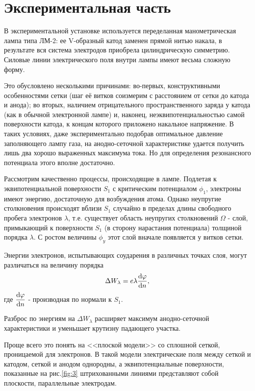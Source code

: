 \section{Экспериментальная часть}
В экспериментальной установке используется переделанная манометрическая лампа типа ЛМ-2: ее V-образный катод заменен прямой нитью накала, в результате вся система электродов приобрела цилиндрическую симметрию. Силовые линии электрического поля внутри лампы имеют весьма сложную форму.

Это обусловлено несколькими причинами: во-первых, конструктивными особенностями сетки (шаг её витков соизмерим с расстоянием от сетки до катода и анода); во вторых, наличием отрицательного пространственного заряда у катода (как в обычной электронной лампе) и, наконец, неэквипотенциальностью самой поверхности катода, к концам которого приложено накальное напряжение. В таких условиях, даже экспериментально подобрав оптимальное давление заполняющего лампу газа, на анодно-сеточной характеристике удается получить лишь два хорошо выраженных максимума тока. Но для определения резонансного потенциала этого вполне достаточно.

Рассмотрим качественно процессы, происходящие в лампе. Подлетая к эквипотенциальной поверхности $S_1$ с критическим потенциалом $\phi_1$, электроны имеют энергию, достаточную для возбуждения атома. Однако  неупругие столкновения происходят вблизи $S_1$ случайно в пределах длины свободного пробега электронов $\lambda$, т.е. существует область неупругих столкновений $\Omega$ -
слой, примыкающий к поверхности $S_1$ (в сторону нарастания потенциала) толщиной порядка $\lambda$. С ростом величины $\phi_y$ этот слой вначале появляется у витков сетки.

Энергии электронов, испытывающих соударения в различных точках слоя, могут различаться на величину порядка
$$\Delta W_{\lambda}= e \lambda \dv{\varphi}{n},$$
где $\displaystyle \dv{\varphi}{n}$ - производная по нормали к $S_1$.

Разброс по энергиям на $\Delta W_{\lambda}$ расширяет максимум анодно-сеточной характеристики и уменьшает крутизну падающего участка.

Проще всего это понять на <<плоской модели>> со сплошной сеткой, проницаемой для электронов. В такой модели электрические поля между сеткой и катодом, сеткой и анодом однородны, а эквипотенциальные поверхности, показанные на рис.\ref{fig:3} штрихованными линиями представляют собой плоскости, параллельные электродам.

